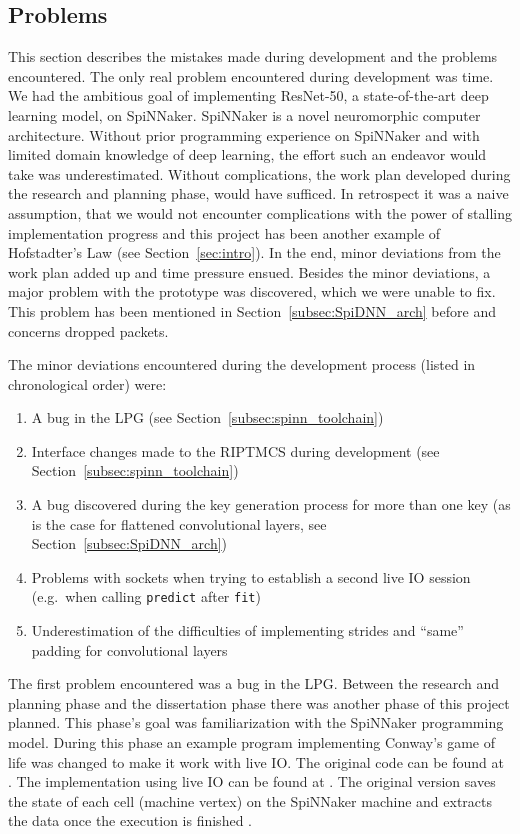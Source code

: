 \documentclass[]{article}
\begin{document}


\subsection{Problems} %
\label{subsec:problems}

This section describes the mistakes made during
development and the problems encountered.
The only real problem encountered during development was time.
We had the ambitious goal of implementing ResNet-50, a
state-of-the-art deep learning model, on SpiNNaker.
SpiNNaker is a novel neuromorphic computer architecture.
Without prior programming experience on SpiNNaker and with limited
domain knowledge of deep learning, the effort such an endeavor would
take was underestimated.
Without complications, the work plan developed during the research and
planning phase, would have sufficed.
In retrospect it was a naive assumption, that we would not encounter
complications with the power of stalling implementation progress
and this project has been another example of Hofstadter's Law
(see Section~\ref{sec:intro}).
In the end, minor deviations from the work plan added up and time
pressure ensued.
Besides the minor deviations, a major problem with the prototype was
discovered, which we were unable to fix.
This problem has been mentioned in Section~\ref{subsec:SpiDNN_arch}
before and concerns dropped packets.

The minor deviations encountered during the development process
(listed in chronological order) were:

\begin{enumerate}
  \item A bug in the LPG (see Section~\ref{subsec:spinn_toolchain})
  \item Interface changes made to the RIPTMCS during development (see
    Section~\ref{subsec:spinn_toolchain})
  \item A bug discovered during the key generation process for more
    than one key (as is the case for flattened convolutional layers,
    see Section~\ref{subsec:SpiDNN_arch})
  \item Problems with sockets when trying to establish a second live
    IO session (e.g.\ when calling \texttt{predict} after
    \texttt{fit})
  \item Underestimation of the difficulties of implementing strides
    and ``same'' padding for convolutional layers
\end{enumerate}

The first problem encountered was a bug in the LPG.
Between the research and planning phase and the dissertation phase
there was another phase of this project planned.
This phase's goal was familiarization with the SpiNNaker programming
model.
During this phase an example program implementing Conway's game of
life \citep{gardener_1970, furber_et_al_2020} was changed to make it
work with live IO.
The original code can be found at \citet{spinnaker_2020b}.
The implementation using live IO can be found at
\citet{fassbender_2020}.
The original version saves the state of each cell (machine vertex)
on the SpiNNaker machine and extracts the data once the execution is
finished \citep{furber_et_al_2020, spinnaker_2020b}.
\end{document}
